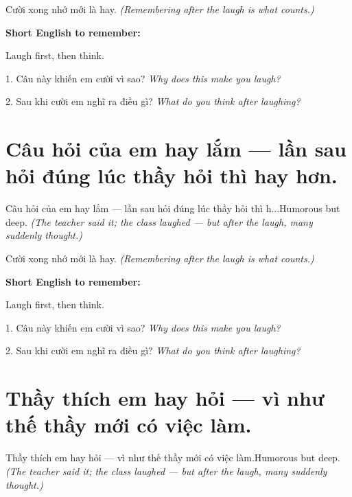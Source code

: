 \begin{baihoc}
Cười xong nhớ mới là hay.
\textit{(Remembering after the laugh is what counts.)}
\end{baihoc}

\begin{ghinhoanh}
\textbf{Short English to remember:}

Laugh first, then think.

\end{ghinhoanh}

\begin{tuhocnhanh}
1. Câu này khiến em cười vì sao? \textit{Why does this make you laugh?}

2. Sau khi cười em nghĩ ra điều gì? \textit{What do you think after laughing?}
\end{tuhocnhanh}
\ngancach


\section{Câu hỏi của em hay lắm — lần sau hỏi đúng lúc thầy hỏi thì hay hơn.}
\begin{truyen}{Câu hỏi của em hay lắm — lần sau hỏi đúng lúc thầy hỏi thì h...}{Humorous but deep.}
\textit{(The teacher said it; the class laughed — but after the laugh, many suddenly thought.)}
\end{truyen}

\begin{baihoc}
Cười xong nhớ mới là hay.
\textit{(Remembering after the laugh is what counts.)}
\end{baihoc}

\begin{ghinhoanh}
\textbf{Short English to remember:}

Laugh first, then think.

\end{ghinhoanh}

\begin{tuhocnhanh}
1. Câu này khiến em cười vì sao? \textit{Why does this make you laugh?}

2. Sau khi cười em nghĩ ra điều gì? \textit{What do you think after laughing?}
\end{tuhocnhanh}
\ngancach


\section{Thầy thích em hay hỏi — vì như thế thầy mới có việc làm.}
\begin{truyen}{Thầy thích em hay hỏi — vì như thế thầy mới có việc làm.}{Humorous but deep.}
\textit{(The teacher said it; the class laughed — but after the laugh, many suddenly thought.)}
\end{truyen}

